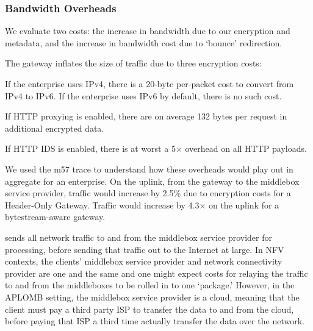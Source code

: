 \subsubsection{Bandwidth Overheads}
We evaluate two costs: the increase in bandwidth due to our encryption and metadata, and the increase in bandwidth cost due to `bounce' redirection.

The gateway inflates the size of traffic due to three encryption costs:
\begin{CompactItemize}
  \item If the enterprise uses IPv4, there is a 20-byte per-packet cost to convert from IPv4 to IPv6. If the enterprise uses IPv6 by default, there is no such cost.
  \item If HTTP proxying is enabled, there are on average 132 bytes per request in additional encrypted data.
  \item If HTTP IDS is enabled, there is at worst a 5$\times$ overhead on all HTTP payloads.
\end{CompactItemize}
We used the m57 trace to understand how these overheads would play out in aggregate for an enterprise.
On the uplink, from the gateway to the middlebox service provider, traffic would increase by 2.5\% due to encryption costs for a Header-Only Gateway. Traffic would increase by 4.3$\times$ on the uplink for a bytestream-aware gateway. 


\sys sends all network traffic to and from the middlebox service provider for processing, before sending that traffic out to the Internet at large. In NFV contexts, the clients' middlebox service provider and network connectivity provider are one and the same and one might expect costs for relaying the traffic to and from the middleboxes to be rolled in to one `package.' 
However, in the APLOMB setting, the middlebox service provider is a cloud, meaning that the client must pay a third party ISP to transfer the data to and from the cloud, before paying that ISP a third time actually transfer the data over the network.

